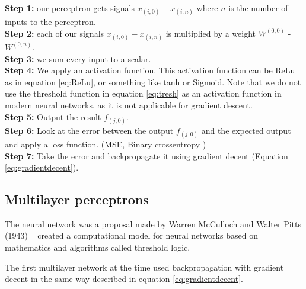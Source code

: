 \noindent \textbf{Step 1:} our perceptron gets signals $x_{(i,0)}-x_{(i,n)}$ where $n$ is the number of inputs to the perceptron.\\

\noindent \textbf{Step 2:} each of our signals $x_{(i,0)}-x_{(i,n)}$ is multiplied by a weight $W^{(0,0)}$ -  $W^{(0,n)}$. \\

\noindent \textbf{Step 3:} we sum every input to a scalar. \\

\noindent \textbf{Step 4:} We apply an activation function. This activation function can be ReLu as in equation \ref{eq:ReLu}, or something like tanh or Sigmoid. Note that we do not use the threshold function in equation \ref{eq:tresh} as an activation function in modern neural networks, as it is not applicable for gradient descent.\\

\noindent \textbf{Step 5:} Output the result $f_{(j,0)}$.\\

\noindent \textbf{Step 6:} Look at the error between the output $f_{(j,0)}$ and the expected output and apply a loss function. (MSE, Binary crossentropy )\\

\noindent \textbf{Step 7:} Take the error and backpropagate it using gradient decent (Equation \ref{eq:gradientdecent}).\\





\subsection{Multilayer perceptrons}
\label{cha:MLP}
The neural network was a proposal made by Warren McCulloch and Walter Pitts (1943) ~\cite{roweis2000nonlinear}  created a computational model for neural networks based on mathematics and algorithms called threshold logic. 

The first multilayer network at the time used backpropagation with gradient decent in the same way described in equation \ref{eq:gradientdecent}.

